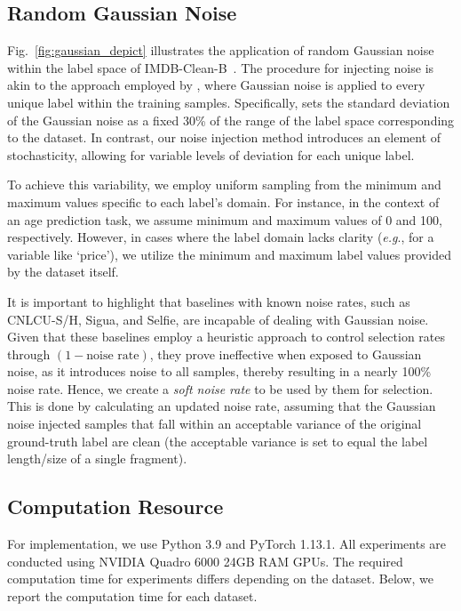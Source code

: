 \documentclass{article}
\def\eg{\textit{e.g}., } \def\Eg{\textit{E.g}., }
\theoremstyle{plain}
\theoremstyle{definition}
\theoremstyle{remark}
\begin{document}
\subsection{Random Gaussian Noise}\label{subsec:random_gaussian}
Fig.~\ref{fig:gaussian_depict} illustrates the application of random Gaussian noise within the label space of IMDB-Clean-B~\citep{lin2021imdbclean}. 
The procedure for injecting noise is akin to the approach employed by \citet{yao22cmixup}, where Gaussian noise is applied to every unique label within the training samples. 
Specifically, \citet{yao22cmixup} sets the standard deviation of the Gaussian noise as a fixed 30\% of the range of the label space corresponding to the dataset. 
In contrast, our noise injection method introduces an element of stochasticity, allowing for variable levels of deviation for each unique label.

To achieve this variability, we employ uniform sampling from the minimum and maximum values specific to each label's domain. 
For instance, in the context of an age prediction task, we assume minimum and maximum values of 0 and 100, respectively. 
However, in cases where the label domain lacks clarity (\eg for a variable like `price'), we utilize the minimum and maximum label values provided by the dataset itself.

It is important to highlight that baselines with known noise rates, such as CNLCU-S/H, Sigua, and Selfie, are incapable of dealing with Gaussian noise.
Given that these baselines employ a heuristic approach to control selection rates through $(1 - \text{noise rate})$,
they prove ineffective when exposed to Gaussian noise, as it introduces noise to all samples, thereby resulting in a nearly 100\% noise rate.
Hence, we create a \emph{soft noise rate} to be used by them for selection.
This is done by calculating an updated noise rate, assuming that the Gaussian noise injected samples that fall within an acceptable variance of the original ground-truth label are clean
(the acceptable variance is set to equal the label length/size of a single fragment).

\subsection{Computation Resource}\label{subsec:computation_resource}

For implementation, we use Python 3.9 and PyTorch 1.13.1.
All experiments are conducted using NVIDIA Quadro 6000 24GB RAM GPUs.
The required computation time for experiments differs depending on the dataset.
Below, we report the computation time for each dataset.
\end{document}
